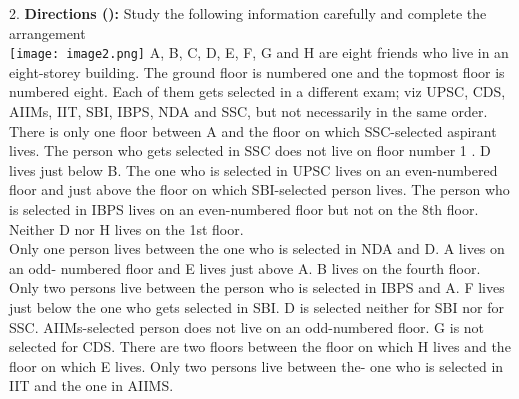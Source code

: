 \documentclass[
]{article}
\begin{document}
2. \textbf{Directions ():} Study the following information carefully and complete the arrangement\\
\texttt{[image: image2.png]}
A, B, C, D, E, F, G and H are eight friends who live in an eight-storey building. The ground
floor is numbered one and the topmost floor is numbered eight. Each of them gets selected
in a different exam; viz UPSC, CDS, AIIMs, IIT, SBI, IBPS, NDA and SSC, but not necessarily
in the same order. There is only one floor between A and the floor on which SSC-selected
aspirant lives. The person who gets selected in SSC does not live on floor number 1 . D lives
just below B. The one who is selected in UPSC lives on an even-numbered floor and just
above the floor on which SBI-selected person lives. The person who is selected in IBPS lives
on an even-numbered floor but not on the 8th floor. Neither D nor H lives on the 1st floor.\\
Only one person lives between the one who is selected in NDA and D. A lives on an odd-
numbered floor and E lives just above A. B lives on the fourth floor. Only two persons live
between the person who is selected in IBPS and A. F lives just below the one who gets
selected in SBI. D is selected neither for SBI nor for SSC. AIIMs-selected person does not live
on an odd-numbered floor. G is not selected for CDS. There are two floors between the floor
on which H lives and the floor on which E lives. Only two persons live between the- one
who is selected in IIT and the one in AIIMS.\\
\end{document}
